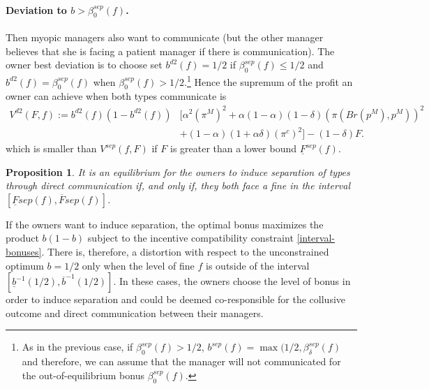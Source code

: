 \documentclass[]{article}
\newtheorem{proposition}{Proposition}
\begin{document}
\paragraph{Deviation to $b>\beta^{sep}_0(f)$.} Then myopic managers also want to communicate (but the other manager believes that she is facing a patient manager if there is communication). The owner best deviation is to choose set $b^{d2}(f)=1/2$ if $\beta^{sep}_0(f)\leq 1/2$ and $b^{d2}(f)=\beta^{sep}_0(f)$ when $\beta^{sep}_0(f)> 1/2$.\footnote{As in the previous case, if $\beta^{sep}_0(f)> 1/2$, $b^{sep}(f)=\max(1/2,\beta^{sep}_\delta(f)$ and therefore, we can assume that the manager will not communicated for the out-of-equilibrium bonus $\beta^{sep}_0(f)$.}  Hence the supremum of the profit an owner can achieve when both types communicate is
%
\begin{equation*}%
\begin{split}
V^{d2}(F,f):=b^{d2}(f)(1-b^{d2}(f))& \Big[\alpha^2 (\pi^M)^2+\alpha(1-\alpha)(1-\delta)(\pi(Br(p^M),p^M))^2\\
&+(1-\alpha)(1+\alpha \delta) (\pi^c)^2\Big] - (1-\delta)F.
\end{split}
\end{equation*}
%
which is smaller than $V^{sep}(f,F)$ if $F$ is greater than a lower bound $\underline F^{sep}(f)$.
%
\begin{proposition}\label{prop:separation-owners-managers}
It is an equilibrium for the owners to induce separation of types through direct communication if, and only if, they both face a fine in the interval $[\underline{F}{sep}(f),\overline{F}{sep}(f)]$.  
\end{proposition}
%
If the owners want to induce separation, the optimal bonus maximizes the product $b(1-b)$ subject to the incentive compatibility constraint \eqref{interval-bonuses}. There is, therefore, a distortion with respect to the unconstrained optimum $b=1/2$ only when the level of fine $f$ is outside of the interval $[\underline b^{-1}(1/2),\overline b^{-1}(1/2)]$. In these cases, the owners choose the level of bonus in order to induce separation and could be deemed co-responsible for the collusive outcome and direct communication between their managers.
\end{document}
